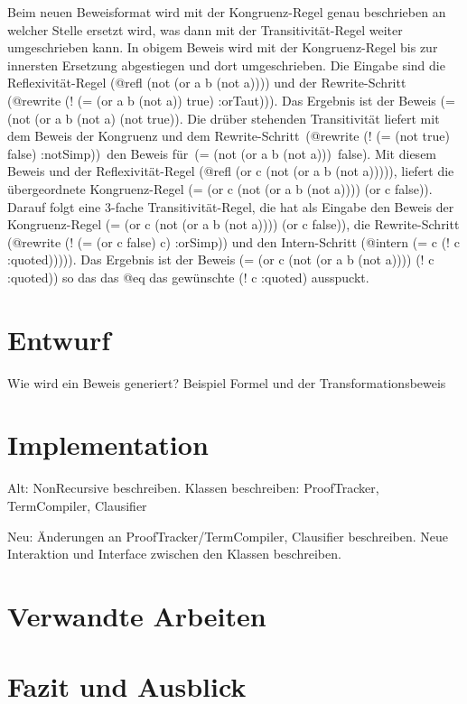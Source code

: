 \documentclass[a4paper]{article}
\begin{document}
Beim neuen Beweisformat wird mit der Kongruenz-Regel genau beschrieben an welcher Stelle ersetzt wird,
was dann mit der Transitivität-Regel weiter umgeschrieben kann.
In obigem Beweis wird mit der Kongruenz-Regel bis zur innersten Ersetzung abgestiegen und dort umgeschrieben.
Die Eingabe sind die Reflexivität-Regel (@refl (not (or a b (not a)))) und der Rewrite-Schritt (@rewrite (! (= (or a b (not a)) true) :orTaut))).
Das Ergebnis ist der Beweis (= (not (or a b (not a) (not true)).
Die drüber stehenden Transitivität liefert mit dem Beweis der Kongruenz und dem Rewrite-Schritt\, (@rewrite (! (= (not true) false) :notSimp))\, den Beweis für\, (= (not (or a b (not a)))\, false).
Mit diesem Beweis und der Reflexivität-Regel (@refl (or c (not (or a b (not a))))),
liefert die übergeordnete Kongruenz-Regel (= (or c (not (or a b (not a)))) (or c false)).
Darauf folgt eine 3-fache Transitivität-Regel, die hat als Eingabe den Beweis der Kongruenz-Regel (= (or c (not (or a b (not a)))) (or c false)),
die Rewrite-Schritt (@rewrite (! (= (or c false) c) :orSimp)) und den Intern-Schritt (@intern (= c (! c :quoted))))).
Das Ergebnis ist der Beweis (= (or c (not (or a b (not a)))) (! c :quoted)) so das das @eq das gewünschte (! c :quoted) ausspuckt.

\section{Entwurf}

Wie wird ein Beweis generiert?
Beispiel Formel und der Transformationsbeweis

\section{Implementation}

Alt:
NonRecursive beschreiben.
Klassen beschreiben: ProofTracker, TermCompiler, Clausifier

Neu:
Änderungen an ProofTracker/TermCompiler, Clausifier beschreiben.
Neue Interaktion und Interface zwischen den Klassen beschreiben.


\section{Verwandte Arbeiten}

\section{Fazit und Ausblick}


\end{document}
